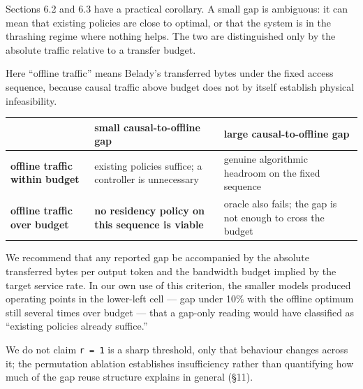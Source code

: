\documentclass[
  10pt,
  letterpaper,
  10pt]{article}
\newcounter{none} %
\begin{document}
Sections 6.2 and 6.3 have a practical corollary. A small gap is
ambiguous: it can mean that existing policies are close to optimal, or
that the system is in the thrashing regime where nothing helps. The two
are distinguished only by the absolute traffic relative to a transfer
budget.

Here ``offline traffic'' means Belady's transferred bytes under the
fixed access sequence, because causal traffic above budget does not by
itself establish physical infeasibility.

{\def\LTcaptype{none} %
\begin{longtable}[]{@{}
  >{\raggedright\arraybackslash}p{}
  >{\raggedright\arraybackslash}p{}
  >{\raggedright\arraybackslash}p{}@{}}
\toprule\noalign{}
\begin{minipage}[b]{\linewidth}\raggedright
\end{minipage} & \begin{minipage}[b]{\linewidth}\raggedright
small causal-to-offline gap
\end{minipage} & \begin{minipage}[b]{\linewidth}\raggedright
large causal-to-offline gap
\end{minipage} \\
\midrule\noalign{}
\endhead
\bottomrule\noalign{}
\endlastfoot
\textbf{offline traffic within budget} & existing policies suffice; a
controller is unnecessary & genuine algorithmic headroom on the fixed
sequence \\
\textbf{offline traffic over budget} & \textbf{no residency policy on
this sequence is viable} & oracle also fails; the gap is not enough to
cross the budget \\
\end{longtable}
}

We recommend that any reported gap be accompanied by the absolute
transferred bytes per output token and the bandwidth budget implied by
the target service rate. In our own use of this criterion, the smaller
models produced operating points in the lower-left cell --- gap under
10\% with the offline optimum still several times over budget --- that a
gap-only reading would have classified as ``existing policies already
suffice.''

We do not claim \texttt{r\ =\ 1} is a sharp threshold, only that
behaviour changes across it; the permutation ablation establishes
insufficiency rather than quantifying how much of the gap reuse
structure explains in general (§11).
\end{document}
